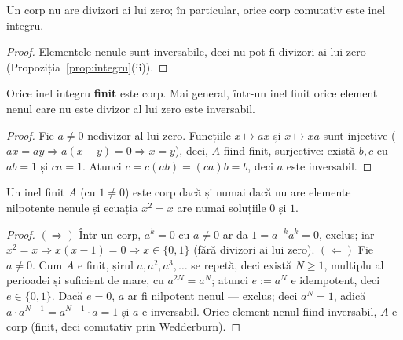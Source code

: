 \begin{propozitie}\label{prop:corpintegru}
Un corp nu are divizori ai lui zero; în particular, orice corp comutativ este inel integru.
\end{propozitie}

\begin{proof}
Elementele nenule sunt inversabile, deci nu pot fi divizori ai lui zero (Propoziția~\ref{prop:integru}(ii)).
\end{proof}

\begin{teorema}\label{teo:integrufinit}
Orice inel integru \textbf{finit} este corp. Mai general, într-un inel finit orice element nenul care nu este divizor al lui zero este inversabil.
\end{teorema}

\begin{proof}
Fie $a\neq0$ nedivizor al lui zero. Funcțiile $x\mapsto ax$ și $x\mapsto xa$ sunt injective ($ax=ay\Rightarrow a(x-y)=0\Rightarrow x=y$), deci, $A$ fiind finit, surjective: există $b,c$ cu $ab=1$ și $ca=1$. Atunci $c=c(ab)=(ca)b=b$, deci $a$ este inversabil.
\end{proof}

\begin{propozitie}\label{prop:finitcorp}
Un inel finit $A$ (cu $1\neq0$) este corp dacă și numai dacă nu are elemente nilpotente nenule și ecuația $x^2=x$ are numai soluțiile $0$ și $1$.
\end{propozitie}
\begin{proof}
$(\Rightarrow)$ Într-un corp, $a^k=0$ cu $a\neq0$ ar da $1=a^{-k}a^k=0$, exclus; iar $x^2=x\Rightarrow x(x-1)=0\Rightarrow x\in\{0,1\}$ (fără divizori ai lui zero).
$(\Leftarrow)$ Fie $a\neq0$. Cum $A$ e finit, șirul $a,a^2,a^3,\dots$ se repetă, deci există $N\ge1$, multiplu al perioadei și suficient de mare, cu $a^{2N}=a^N$; atunci $e:=a^N$ e idempotent, deci $e\in\{0,1\}$. Dacă $e=0$, $a$ ar fi nilpotent nenul --- exclus; deci $a^N=1$, adică $a\cdot a^{N-1}=a^{N-1}\cdot a=1$ și $a$ e inversabil. Orice element nenul fiind inversabil, $A$ e corp (finit, deci comutativ prin Wedderburn).
\end{proof}

